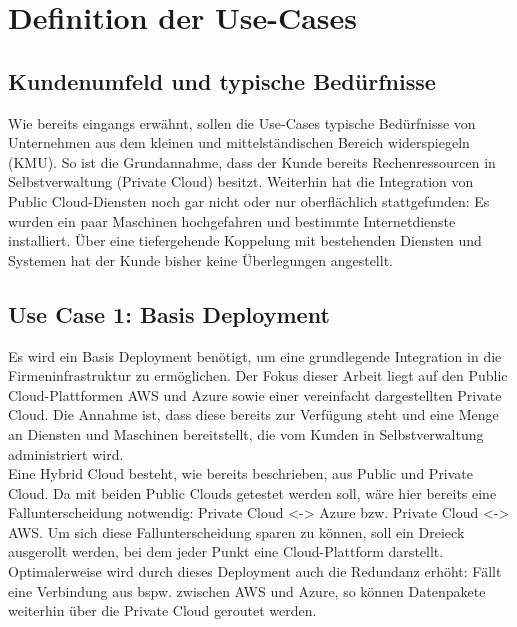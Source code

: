 \chapter{Definition der Use-Cases} \label{Umsetzung der Use-Cases und Evaluation}

\section{Kundenumfeld und typische Bedürfnisse} \label{Kundenumfeld und typische Bedürfnisse}

Wie bereits eingangs erwähnt, sollen die Use-Cases typische Bedürfnisse von Unternehmen aus dem kleinen und mittelständischen Bereich widerspiegeln (KMU). So ist die Grundannahme, dass der Kunde bereits Rechenressourcen in Selbstverwaltung (\glqq Private Cloud\grqq{}) besitzt. Weiterhin hat die Integration von Public Cloud-Diensten noch gar nicht oder nur oberflächlich stattgefunden: Es wurden ein paar Maschinen hochgefahren und bestimmte Internetdienste installiert. Über eine tiefergehende Koppelung mit bestehenden Diensten und Systemen hat der Kunde bisher keine Überlegungen angestellt. %


\section{Use Case 1: Basis Deployment}


Es wird ein Basis Deployment benötigt, um eine grundlegende Integration in die Firmeninfrastruktur zu ermöglichen.
Der Fokus dieser Arbeit liegt auf den Public Cloud-Plattformen AWS und Azure sowie einer vereinfacht dargestellten Private Cloud. Die Annahme ist, dass diese bereits zur Verfügung steht und eine Menge an Diensten und Maschinen bereitstellt, die vom Kunden in Selbstverwaltung administriert wird.\\
Eine Hybrid Cloud besteht, wie bereits beschrieben, aus Public und Private Cloud. Da mit beiden Public Clouds getestet werden soll, wäre hier bereits eine Fallunterscheidung notwendig: Private Cloud <-> Azure bzw. Private Cloud <-> AWS. Um sich diese Fallunterscheidung sparen zu können, soll ein Dreieck ausgerollt werden, bei dem jeder Punkt eine Cloud-Plattform darstellt.
Optimalerweise wird durch dieses Deployment auch die Redundanz erhöht: Fällt eine Verbindung aus bspw. zwischen AWS und Azure, so können Datenpakete weiterhin über die Private Cloud geroutet werden.

